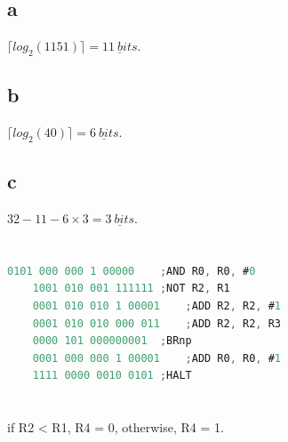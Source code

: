 \documentclass[11pt,a4paper]{article}
\begin{document}
	\section{}
	\subsection*{a}
	$\lceil log_{2}(1151)\rceil=\underline{11\ bits}$.
	\subsection*{b}
	$\lceil log_{2}(40)\rceil=\underline{6\ bits}$.
	\subsection*{c}
	$32-11-6\times 3=\underline{3\ bits}$.
	
	\section{}
	\begin{lstlisting}[language=C]
	0101 000 000 1 00000	;AND R0, R0, #0
	1001 010 001 111111	;NOT R2, R1
	0001 010 010 1 00001	;ADD R2, R2, #1
	0001 010 010 000 011	;ADD R2, R2, R3
	0000 101 000000001	;BRnp
	0001 000 000 1 00001	;ADD R0, R0, #1
	1111 0000 0010 0101	;HALT
	\end{lstlisting}
	
	\section{}
	if R2 < R1, R4 = 0, otherwise, R4 = 1.
	
	
	
		
	
	

	
\end{document}
